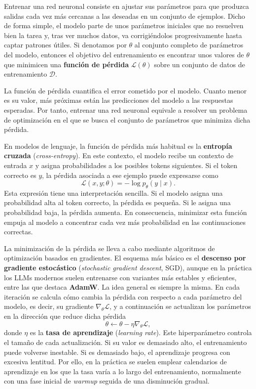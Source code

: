 Entrenar una red neuronal consiste en ajustar sus parámetros para que produzca salidas cada vez más cercanas a las deseadas en un conjunto de ejemplos. Dicho de forma simple, el modelo parte de unos parámetros iniciales que no resuelven bien la tarea y, tras ver muchos datos, va corrigiéndolos progresivamente hasta captar patrones útiles. Si denotamos por $\theta$ al conjunto completo de parámetros del modelo, entonces el objetivo del entrenamiento es encontrar unos valores de $\theta$ que minimicen una \textbf{función de pérdida} $\mathcal{L}(\theta)$ sobre un conjunto de datos de entrenamiento $\mathcal{D}$.

La función de pérdida cuantifica el error cometido por el modelo. Cuanto menor es su valor, más próximas están las predicciones del modelo a las respuestas esperadas. Por tanto, entrenar una red neuronal equivale a resolver un problema de optimización en el que se busca el conjunto de parámetros que minimiza dicha pérdida.

En modelos de lenguaje, la función de pérdida más habitual es la \textbf{entropía cruzada} (\textit{cross-entropy}). En este contexto, el modelo recibe un contexto de entrada $x$ y asigna probabilidades a los posibles tokens siguientes. Si el token correcto es $y$, la pérdida asociada a ese ejemplo puede expresarse como
\[
\mathcal{L}(x,y;\theta) = -\log p_\theta(y \mid x).
\]
Esta expresión tiene una interpretación sencilla. Si el modelo asigna una probabilidad alta al token correcto, la pérdida es pequeña. Si le asigna una probabilidad baja, la pérdida aumenta. En consecuencia, minimizar esta función empuja al modelo a concentrar cada vez más probabilidad en las continuaciones correctas.

La minimización de la pérdida se lleva a cabo mediante algoritmos de optimización basados en gradientes. El esquema más básico es el \textbf{descenso por gradiente estocástico} (\textit{stochastic gradient descent}, SGD), aunque en la práctica los LLMs modernos suelen entrenarse con variantes más estables y eficientes, entre las que destaca \textbf{AdamW}. La idea general es siempre la misma. En cada iteración se calcula cómo cambia la pérdida con respecto a cada parámetro del modelo, es decir, su gradiente $\nabla_\theta \mathcal{L}$, y a continuación se actualizan los parámetros en la dirección que reduce dicha pérdida
\[
\theta \leftarrow \theta - \eta \nabla_\theta \mathcal{L},
\]
donde $\eta$ es la \textbf{tasa de aprendizaje} (\textit{learning rate}). Este hiperparámetro controla el tamaño de cada actualización. Si su valor es demasiado alto, el entrenamiento puede volverse inestable. Si es demasiado bajo, el aprendizaje progresa con excesiva lentitud. Por ello, en la práctica se suelen emplear calendarios de aprendizaje en los que la tasa varía a lo largo del entrenamiento, normalmente con una fase inicial de \textit{warmup} seguida de una disminución gradual.

